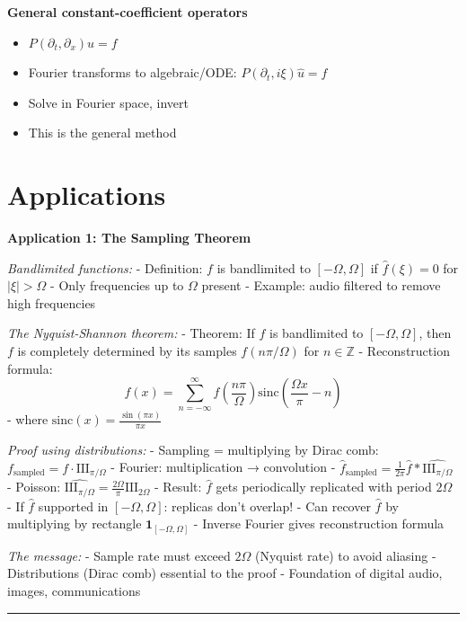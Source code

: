 \documentclass[
  10pt,
  letterpaper,
]{scrbook}
\providecommand{\tightlist}{%
  \setlength{\itemsep}{0pt}\setlength{\parskip}{0pt}}
\begin{document}
\textbf{General constant-coefficient operators}

\begin{itemize}
\tightlist
\item
  \(P(\partial_t, \partial_x) u = f\)
\item
  Fourier transforms to algebraic/ODE:
  \(P(\partial_t, i\xi)\hat{u} = \hat{f}\)
\item
  Solve in Fourier space, invert
\item
  This is the general method
\end{itemize}

\section{Applications}\label{applications}

\textbf{Application 1: The Sampling Theorem}

\emph{Bandlimited functions:} - Definition: \(f\) is bandlimited to
\([-\Omega, \Omega]\) if \(\hat{f}(\xi) = 0\) for \(|\xi| > \Omega\) -
Only frequencies up to \(\Omega\) present - Example: audio filtered to
remove high frequencies

\emph{The Nyquist-Shannon theorem:} - Theorem: If \(f\) is bandlimited
to \([-\Omega, \Omega]\), then \(f\) is completely determined by its
samples \(f(n\pi/\Omega)\) for \(n \in \mathbb{Z}\) - Reconstruction
formula:
\[f(x) = \sum_{n=-\infty}^\infty f\left(\frac{n\pi}{\Omega}\right) \text{sinc}\left(\frac{\Omega x}{\pi} - n\right)\]
- where \(\text{sinc}(x) = \frac{\sin(\pi x)}{\pi x}\)

\emph{Proof using distributions:} - Sampling = multiplying by Dirac
comb: \(f_{\text{sampled}} = f \cdot \text{III}_{\pi/\Omega}\) -
Fourier: multiplication → convolution -
\(\hat{f}_{\text{sampled}} = \frac{1}{2\pi}\hat{f} * \widehat{\text{III}_{\pi/\Omega}}\)
- Poisson:
\(\widehat{\text{III}_{\pi/\Omega}} = \frac{2\Omega}{\pi} \text{III}_{2\Omega}\)
- Result: \(\hat{f}\) gets periodically replicated with period
\(2\Omega\) - If \(\hat{f}\) supported in \([-\Omega, \Omega]\):
replicas don't overlap! - Can recover \(\hat{f}\) by multiplying by
rectangle \(\mathbf{1}_{[-\Omega,\Omega]}\) - Inverse Fourier gives
reconstruction formula

\emph{The message:} - Sample rate must exceed \(2\Omega\) (Nyquist rate)
to avoid aliasing - Distributions (Dirac comb) essential to the proof -
Foundation of digital audio, images, communications

\begin{center}\rule{0.5\linewidth}{0.5pt}\end{center}
\end{document}
